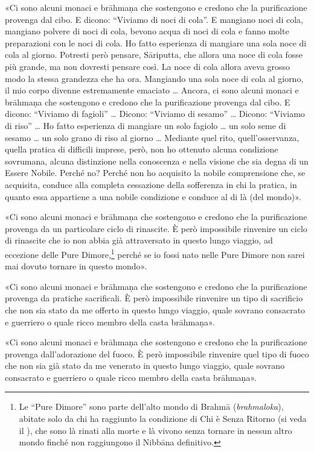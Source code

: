 «Ci sono alcuni monaci e brāhmaṇa che sostengono e credono che la purificazione
provenga dal cibo. E dicono: “Viviamo di noci di cola”. E mangiano noci di cola,
mangiano polvere di noci di cola, bevono acqua di noci di cola e fanno molte
preparazioni con le noci di cola. Ho fatto esperienza di mangiare una sola noce
di cola al giorno. Potresti però pensare, Sāriputta, che allora una noce di cola
fosse più grande, ma non dovresti pensare così. La noce di cola allora aveva
grosso modo la stessa grandezza che ha ora. Mangiando una sola noce di cola al
giorno, il mio corpo divenne estremamente emaciato … Ancora, ci sono alcuni
monaci e brāhmaṇa che sostengono e credono che la purificazione provenga dal
cibo. E dicono: “Viviamo di fagioli” … Dicono: “Viviamo di sesamo” … Dicono:
“Viviamo di riso” … Ho fatto esperienza di mangiare un solo fagiolo … un solo
seme di sesamo … un solo grano di riso al giorno … Mediante quel rito,
quell’osservanza, quella pratica di difficili imprese, però, non ho ottenuto
alcuna condizione sovrumana, alcuna distinzione nella conoscenza e nella visione
che sia degna di un Essere Nobile. Perché no? Perché non ho acquisito la nobile
comprensione che, se acquisita, conduce alla completa cessazione della
sofferenza in chi la pratica, in quanto essa appartiene a una nobile condizione
e conduce al di là (del mondo)».

«Ci sono alcuni monaci e brāhmaṇa che sostengono e credono che la purificazione
provenga da un particolare ciclo di rinascite. È però impossibile rinvenire un
ciclo di rinascite che io non abbia già attraversato in questo lungo viaggio, ad
eccezione delle Pure Dimore,\footnote{Le “Pure Dimore” sono parte dell’alto
  mondo di Brahmā (\emph{brahmaloka}), abitate solo da chi ha raggiunto la
  condizione di Chi è Senza Ritorno (si veda il
  \hyperlink{cap-12-La-Dottrina#pag263}{}), che sono là rinati alla morte e là
  vivono senza tornare in nessun altro mondo finché non raggiungono il Nibbāna
  definitivo.} perché se io fossi nato nelle Pure Dimore non sarei mai dovuto
tornare in questo mondo».

«Ci sono alcuni monaci e brāhmaṇa che sostengono e credono che la purificazione
provenga da pratiche sacrificali. È però impossibile rinvenire un tipo di
sacrificio che non sia stato da me offerto in questo lungo viaggio, quale
sovrano consacrato e guerriero o quale ricco membro della casta brāhmaṇa».

«Ci sono alcuni monaci e brāhmaṇa che sostengono e credono che la purificazione
provenga dall’adorazione del fuoco. È però impossibile rinvenire quel tipo di
fuoco che non sia già stato da me venerato in questo lungo viaggio, quale
sovrano consacrato e guerriero o quale ricco membro della casta brāhmaṇa».

